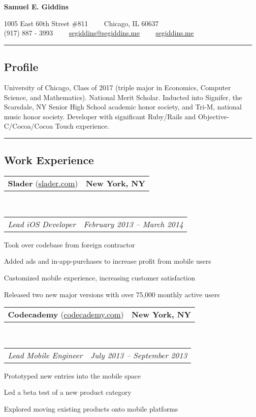 \documentclass[10pt,letterpaper]{article}
\makeatletter
\newcommand{\headerrow}[2]
{\noindent \begin{tabular*}{\linewidth}{l@{\extracolsep{\fill}}r}
	#1 &
	#2 \\
\end{tabular*}}
\newcommand{\ahref}[1]
{\href{http://#1}{#1}}
\makeatother
\begin{document}
\begin{center}
{\LARGE \textbf{Samuel E. Giddins}}

1005 East 60th Street \#811\ \ \textbullet
\ \ Chicago, IL 60637
\\
(917) 887 - 3993\ \ \textbullet
\ \ \href{mailto:segiddins@segiddins.me}{segiddins@segiddins.me}\ \ \textbullet
\ \ \ahref{segiddins.me}
\end{center}

\hrule
\vspace{-0.4em}
\subsection*{Profile}
University of Chicago, Class of 2017 (triple major in Economics, Computer Science, and Mathematics).
National Merit Scholar.
Inducted into Signifer, the Scarsdale, NY Senior High School academic honor society, and Tri-M, national music honor society.
Developer with significant Ruby/Rails and Objective-C/Cocoa/Cocoa Touch experience.

\vspace{0.8em}
\hrule
\vspace{-0.4em}
\subsection*{Work Experience}


	\headerrow
		{\textbf{Slader} (\ahref{slader.com})}
		{\textbf{New York, NY}}
	\\
	\headerrow
		{\emph{Lead iOS Developer}}
		{\emph{February 2013 -- March 2014}}
	\begin{itemize*}
		\item Took over codebase from foreign contractor
		\item Added ads and in-app-purchases to increase profit from mobile users
		\item Customized mobile experience, increasing customer satisfaction
		\item Released two new major versions with over 75,000 monthly active users
	\end{itemize*}

	\headerrow
		{\textbf{Codecademy} (\ahref{codecademy.com})}
		{\textbf{New York, NY}}
	\\
	\headerrow
		{\emph{Lead Mobile Engineer}}
		{\emph{July 2013 -- September 2013}}
	\begin{itemize*}
		\item Prototyped new entries into the mobile space
		\item Led a beta test of a new product category
		\item Explored moving existing products onto mobile platforms
	\end{itemize*}
\end{document}
